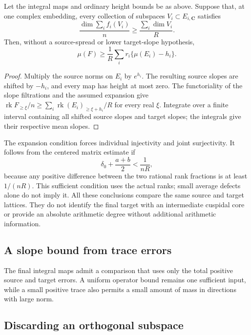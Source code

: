 \begin{corollary}\label{cs-exact-expansion}
Let the integral maps and ordinary height bounds be as above.
Suppose that, at one complex embedding, every collection of subspaces
$V_i\subset E_{i,\mathbf C}$ satisfies
\[
 \frac{\dim\sum_i f_i(V_i)}n
       \ge\frac{\sum_i\dim V_i}{R}.
\]
Then, without a source-spread or lower target-slope hypothesis,
\[
 \mu(F)\ge\frac1R\sum_i r_i\{\mu(E_i)-h_i\}.
\]
\end{corollary}
\begin{proof}
Multiply the source norms on $E_i$ by $e^{h_i}$. The resulting
source slopes are shifted by $-h_i$, and every map has height at most zero.
The functoriality of the slope filtrations and the assumed expansion give
$\operatorname{rk}F_{\ge\xi}/n
\ge\sum_i\operatorname{rk}(E_i)_{\ge\xi+h_i}/R$ for every real $\xi$.
Integrate over a finite interval containing all shifted source slopes
and target slopes; the integrals give their respective mean slopes.
\end{proof}

The expansion condition forces individual injectivity and joint
surjectivity. It follows from the centered matrix estimate if
\[
 \delta_0+\frac{a+b}{2}<\frac1{nR},
\]
because any positive difference between the two rational rank
fractions is at least $1/(nR)$. This sufficient condition uses the
actual ranks; small average defects alone do not imply it.
All these conclusions compare the same source and target lattices.
They do not identify the final target with an intermediate cuspidal
core or provide an absolute arithmetic degree without additional
arithmetic information.

\subsection{A slope bound from trace errors}

The final integral maps admit a comparison that uses only the total
positive source and target errors. A uniform operator bound remains
one sufficient input, while a small positive trace also permits a
small amount of mass in directions with large norm.





\subsection{Discarding an orthogonal subspace}

